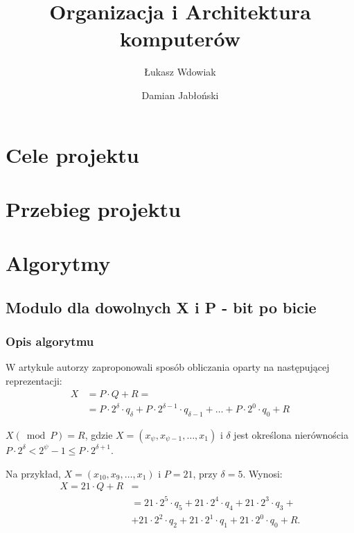 \documentclass[11pt]{article}
\renewcommand\*{\cdot}
\begin{document}
\title{Organizacja i Architektura komputerów}
\author{Łukasz Wdowiak}
\author{Damian Jabłoński}


\tableofcontents

\newpage

\section{Cele projektu}

\section{Przebieg projektu}

\section{Algorytmy}
\subsection{Modulo dla dowolnych X i P - bit po bicie}
\subsubsection{Opis algorytmu}
W artykule autorzy zaproponowali sposób obliczania oparty na następującej reprezentacji:
\begin{align}
    X & =P \cdot Q+R=                                                                                           \\
      & =P \cdot 2^\delta \cdot q_\delta+P \cdot 2^{\delta-1} \cdot q_{\delta-1}+\ldots+P \cdot 2^0 \cdot q_0+R
\end{align}


$X(\bmod P)=R$, gdzie $X=\left(x_\psi, x_{\psi-1}, \ldots, x_1\right)$ i $\delta$ jest określona nierównościa $P \cdot 2^{\delta}<2^\psi-1 \leq P \cdot 2^{\delta+1}$.

Na przykład, $X=\left(x_{10}, x_9, \ldots, x_1\right)$ i $P=21$, przy  $\delta=5$. Wynosi:
$$
    \begin{aligned}
        X=21 \cdot Q+R & =                                                                         \\
                       & =21 \cdot 2^5 \cdot q_5+21 \cdot 2^4 \cdot q_4+21 \cdot 2^3 \cdot q_3+    \\
                       & +21 \cdot 2^2 \cdot q_2+21 \cdot 2^1 \cdot q_1+21 \cdot 2^0 \cdot q_0+R .
    \end{aligned}
$$
\end{document}
